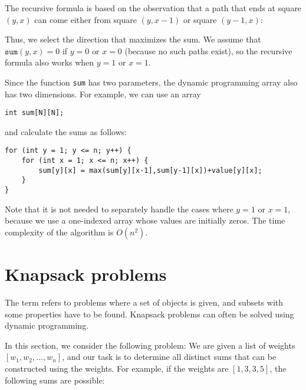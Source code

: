 The recursive formula is based on the observation
that a path that ends at square $(y,x)$
can come either from square $(y,x-1)$
or square $(y-1,x)$:
\begin{center}
\end{center}

Thus, we select the direction that maximizes
the sum.
We assume that $\texttt{sum}(y,x)=0$
if $y=0$ or $x=0$ (because no such paths exist),
so the recursive formula also works when $y=1$ or $x=1$.

Since the function \texttt{sum} has two parameters,
the dynamic programming array also has two dimensions.
For example, we can use an array
\begin{lstlisting}
int sum[N][N];
\end{lstlisting}
and calculate the sums as follows:
\begin{lstlisting}
for (int y = 1; y <= n; y++) {
    for (int x = 1; x <= n; x++) {
        sum[y][x] = max(sum[y][x-1],sum[y-1][x])+value[y][x];
    }
}
\end{lstlisting}

Note that it is not needed to separately handle the
cases where $y=1$ or $x=1$, because we use a
one-indexed array whose values are initially zeros.
The time complexity of the algorithm is $O(n^2)$.

\section{Knapsack problems}


The term  refers to problems where
a set of objects is given, and 
subsets with some properties
have to be found.
Knapsack problems can often be solved
using dynamic programming.

In this section, we consider the following
problem:
We are given a list of weights
$[w_1,w_2,\ldots,w_n]$,
and our task is to determine all distinct
sums that can be constructed using the weights.
For example, if the weights are
$[1,3,3,5]$, the following sums are possible:

